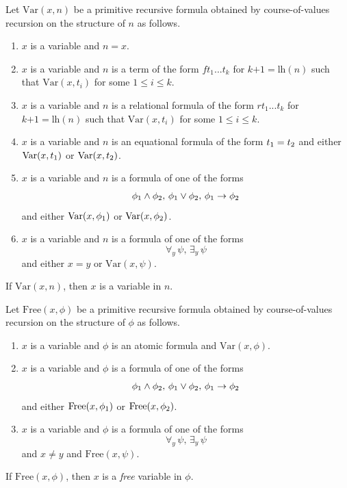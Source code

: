 \documentclass[10pt]{amsart}
\newcommand{\mleq}{\boldsymbol{\leq}}
\newcommand{\meq}{\boldsymbol{=}}
\newcommand{\mplus}{\boldsymbol{+}}
\begin{document}
\begin{definition}
	Let $\mathrm{Var}(x,n)$ be a primitive recursive formula obtained by course-of-values recursion on the structure of $n$ as follows.
	\begin{enumerate}[label=\textbf{(\arabic*)}, leftmargin=3.0em]
		\item $x$ is a variable and $n \meq x$.
		\item $x$ is a variable and $n$ is a term of the form $ft_1...t_k$ for $k \mplus 1 \meq \mathrm{lh}(n)$ such that $\mathrm{Var}(x,t_i)$ for some $1 \mleq i \mleq k$.
		\item $x$ is a variable and $n$ is a relational formula of the form $rt_1...t_k$ for $k \mplus 1 \meq \mathrm{lh}(n)$ such that $\mathrm{Var}(x,t_i)$ for some $1 \mleq i \mleq k$.
		\item $x$ is a variable and $n$ is an equational formula of the form $t_{\rm{1}} = t_{\rm{2}}$ and either $\mathrm{Var}(x,t_{\rm{1}})$ or $\mathrm{Var}(x,t_{\rm{2}})$.
		\item $x$ is a variable and $n$ is a formula of one of the forms
		      $$\phi_{\rm{1}}\wedge \phi_{\rm{2}},\,\phi_{\rm{1}} \vee \phi_{\rm{2}},\,\phi_{\rm{1}}\rightarrow \phi_{\rm{2}}$$
		      and either $\mathrm{Var}(x,\phi_{\rm{1}})$ or $\mathrm{Var}(x,\phi_{\rm{2}})$.
		\item $x$ is a variable and $n$ is a formula of one of the forms
		      $$\forall_y\,\psi,\,\exists_y\,\psi$$
		      and either $x \meq y$ or $\mathrm{Var}(x,\psi)$.
	\end{enumerate}
	If $\mathrm{Var}(x,n)$, then $x$ is a variable in $n$.
\end{definition}

\begin{definition}
	Let $\mathrm{Free}(x,\phi)$ be a primitive recursive formula obtained by course-of-values recursion on the structure of $\phi$ as follows.
	\begin{enumerate}[label=\textbf{(\arabic*)}, leftmargin=3.0em]
		\item $x$ is a variable and $\phi$ is an atomic formula and $\mathrm{Var}(x,\phi)$.
		\item $x$ is a variable and $\phi$ is a formula of one of the forms
		      $$\phi_{\rm{1}}\wedge \phi_{\rm{2}},\,\phi_{\rm{1}} \vee \phi_{\rm{2}},\,\phi_{\rm{1}}\rightarrow \phi_{\rm{2}}$$
		      and either $\mathrm{Free}(x,\phi_{\rm{1}})$ or $\mathrm{Free}(x,\phi_{\rm{2}})$.
		\item $x$ is a variable and $\phi$ is a formula of one of the forms
		      $$\forall_y\,\psi,\,\exists_y\,\psi$$
		      and $x \neq y$ and $\mathrm{Free}(x,\psi)$.
	\end{enumerate}
	If $\mathrm{Free}(x,\phi)$, then $x$ is a \textit{free} variable in $\phi$.
\end{definition}
\end{document}
